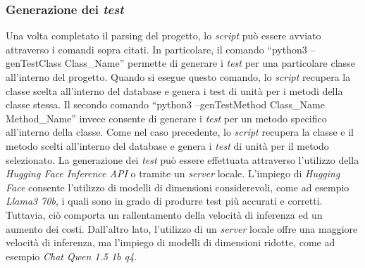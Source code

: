     \subsubsection{Generazione dei \textit{test}}
    Una volta completato il parsing del progetto, lo \textit{script} può essere avviato attraverso i comandi sopra citati.
    In particolare, il comando “python3 --genTestClass Class\_Name” permette di generare i \textit{test} per una particolare classe all'interno del progetto.
    Quando si esegue questo comando, lo \textit{script} recupera la classe scelta all'interno del database e genera i test di unità per i metodi della classe stessa.
    Il secondo comando “python3 --genTestMethod Class\_Name Method\_Name” invece consente di generare i \textit{test} per un metodo specifico all'interno della classe.
    Come nel caso precedente, lo \textit{script} recupera la classe e il metodo scelti all'interno del database e genera i \textit{test} di unità per il metodo selezionato.
    La generazione dei \textit{test} può essere effettuata attraverso l'utilizzo della \textit{Hugging Face Inference API} o tramite un \textit{server} locale. 
    L'impiego di \textit{Hugging Face} consente l'utilizzo di modelli di dimensioni considerevoli, come ad esempio \textit{Llama3 70b}, i quali sono in grado di produrre test più accurati e corretti. Tuttavia, ciò comporta un rallentamento della velocità di inferenza ed un aumento dei costi. 
    Dall'altro lato, l'utilizzo di un \textit{server} locale offre una maggiore velocità di inferenza, ma l'impiego di modelli di dimensioni ridotte, come ad esempio \textit{Chat Qwen 1.5 1b q4}.

